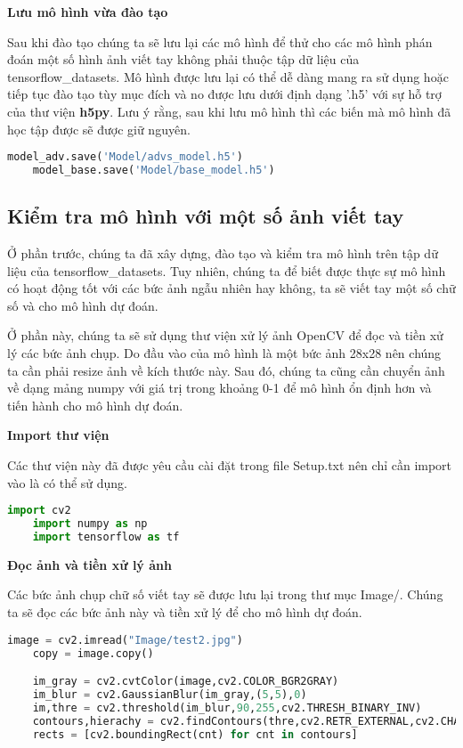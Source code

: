 \textbf{Lưu mô hình vừa đào tạo}

Sau khi đào tạo chúng ta sẽ lưu lại các mô hình để thử cho các mô hình phán đoán một số hình ảnh viết tay không phải thuộc tập dữ
liệu của tensorflow\_datasets. Mô hình được lưu lại có thể dễ dàng mang ra sử dụng hoặc tiếp tục đào tạo tùy mục đích và no được lưu dưới định dạng '.h5' với sự hỗ trợ của
thư viện \textbf{h5py}. Lưu ý rằng, sau khi lưu mô hình thì các biến mà mô hình đã học tập được sẽ được giữ nguyên.

\begin{lstlisting}[language = Python]
    model_adv.save('Model/advs_model.h5')
    model_base.save('Model/base_model.h5')
\end{lstlisting}

\cite*{WEBSITE}

\subsection{Kiểm tra mô hình với một số ảnh viết tay}

Ở phần trước, chúng ta đã xây dựng, đào tạo và kiểm tra mô hình trên tập dữ liệu của tensorflow\_datasets. Tuy nhiên, chúng ta 
để biết được thực sự mô hình có hoạt động tốt với các bức ảnh ngẫu nhiên hay không, ta sẽ viết tay một số chữ số và cho mô hình dự đoán.

Ở phần này, chúng ta sẽ sử dụng thư viện xử lý ảnh OpenCV để đọc và tiền xử lý các bức ảnh chụp. Do đầu vào của mô hình là một bức ảnh 28x28
nên chúng ta cần phải resize ảnh về kích thước này. Sau đó, chúng ta cũng cần chuyển ảnh về dạng mảng numpy với giá trị trong khoảng 0-1 để mô hình ổn định hơn và 
tiến hành cho mô hình dự đoán.

\textbf{Import thư viện}

Các thư viện này đã được yêu cầu cài đặt trong file Setup.txt nên chỉ cần import vào là có thể sử dụng.
\begin{lstlisting}[language = Python]
    import cv2
    import numpy as np
    import tensorflow as tf
\end{lstlisting}

\textbf{Đọc ảnh và tiền xử lý ảnh}

Các bức ảnh chụp chữ số viết tay sẽ được lưu lại trong thư mục Image/. Chúng ta sẽ đọc các bức ảnh này và tiền xử lý để cho mô hình dự đoán.

\begin{lstlisting}[language = Python]
    image = cv2.imread("Image/test2.jpg")
    copy = image.copy()

    im_gray = cv2.cvtColor(image,cv2.COLOR_BGR2GRAY)
    im_blur = cv2.GaussianBlur(im_gray,(5,5),0)
    im,thre = cv2.threshold(im_blur,90,255,cv2.THRESH_BINARY_INV)
    contours,hierachy = cv2.findContours(thre,cv2.RETR_EXTERNAL,cv2.CHAIN_APPROX_SIMPLE)
    rects = [cv2.boundingRect(cnt) for cnt in contours]

\end{lstlisting}

